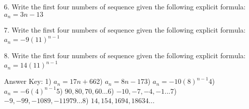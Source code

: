 \documentclass[12pt]{article}
\begin{document}
6. Write the first four numbers of sequence given the following
explicit formula:   $a_n = 3n -13$ 

\vspace{.2in}





7. Write the first four numbers of sequence given the following
explicit formula:   $a_n = -9(11)^{n-1}$

\vspace{.2in}



8. Write the first four numbers of sequence given the following
explicit formula:   $a_n = 14(11)^{n-1}$

\vspace{.2in}




Answer Key: 1) $a_n = 17n + 66$\hspace{.5 in}2) $a_n = 8n -17$\hspace{.5 in}3) $a_n = -10(8)^{n-1}$\hspace{.5 in}4) $a_n = -6(4)^{n-1}$\hspace{.5 in}5) $90, 80, 70, 60 . . .$\hspace{.5 in}6) $-10, -7, -4, -1 . . .$\hspace{.5 in}7) $-9, -99, -1089, -11979 . . .$\hspace{.5 in}8) $14, 154, 1694, 18634 . . .$\hspace{.5 in}
\end{document}
